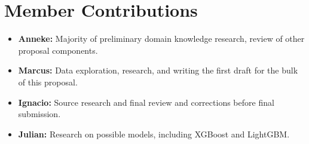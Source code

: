 \documentclass{article}
\begin{document}
\section{Member Contributions}

\begin{itemize}
    \item \textbf{Anneke:} Majority of preliminary domain knowledge research, review of other proposal components.
    \item \textbf{Marcus:} Data exploration, research, and writing the first draft for the bulk of this proposal.
    \item \textbf{Ignacio:} Source research and final review and corrections before final submission.
    \item \textbf{Julian:} Research on possible models, including XGBoost and LightGBM.
\end{itemize}


\newpage


\end{document}
